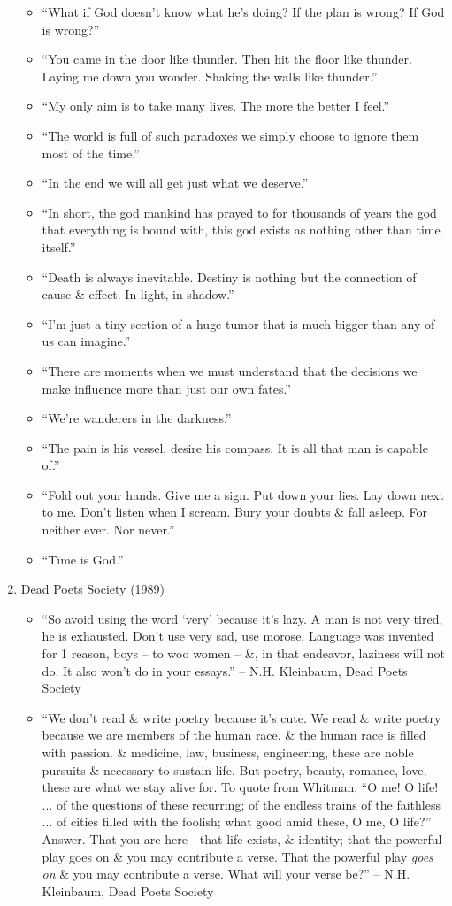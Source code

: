 \documentclass{article}
\begin{document}
\begin{enumerate}
\begin{itemize}
		\item ``What if God doesn't know what he's doing? If the plan is wrong? If God is wrong?''
		\item ``You came in the door like thunder. Then hit the floor like thunder. Laying me down you wonder. Shaking the walls like thunder.''
		\item ``My only aim is to take many lives. The more the better I feel.''
		\item ``The world is full of such paradoxes we simply choose to ignore them most of the time.''
		\item ``In the end we will all get just what we deserve.''
		\item ``In short, the god mankind has prayed to for thousands of years the god that everything is bound with, this god exists as nothing other than time itself.''
		\item ``Death is always inevitable. Destiny is nothing but the connection of cause \& effect. In light, in shadow.''
		\item ``I'm just a tiny section of a huge tumor that is much bigger than any of us can imagine.''
		\item ``There are moments when we must understand that the decisions we make influence more than just our own fates.''
		\item ``We're wanderers in the darkness.''
		\item ``The pain is his vessel, desire his compass. It is all that man is capable of.''
		\item ``Fold out your hands. Give me a sign. Put down your lies. Lay down next to me. Don't listen when I scream. Bury your doubts \& fall asleep. For neither ever. Nor never.''
		\item ``Time is God.''
	\end{itemize}	
	\item {\sc Dead Poets Society} (1989)
	\begin{itemize}
		\item ``So avoid using the word `very' because it's lazy. A man is not very tired, he is exhausted. Don't use very sad, use morose. Language was invented for 1 reason, boys -- to woo women -- \&, in that endeavor, laziness will not do. It also won't do in your essays.'' --  N.H. Kleinbaum, Dead Poets Society
		\item ``We don't read \& write poetry because it's cute. We read \& write poetry because we are members of the human race. \& the human race is filled with passion. \& medicine, law, business, engineering, these are noble pursuits \& necessary to sustain life. But poetry, beauty, romance, love, these are what we stay alive for. To quote from Whitman, ``O me! O life! $\ldots$ of the questions of these recurring; of the endless trains of the faithless $\ldots$ of cities filled with the foolish; what good amid these, O me, O life?'' Answer. That you are here - that life exists, \& identity; that the powerful play goes on \& you may contribute a verse. That the powerful play \emph{goes on} \& you may contribute a verse. What will your verse be?'' --  N.H. Kleinbaum, Dead Poets Society

\end{itemize}
\end{enumerate}
\end{document}
